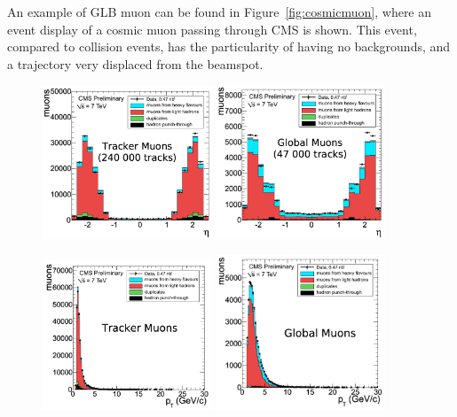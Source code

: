 An example of GLB muon can be found in Figure~\ref{fig:cosmicmuon},
where an event display of a cosmic muon passing through CMS is
shown. This event, compared to collision events, has the particularity
of having no backgrounds, and a trajectory very displaced from the
beamspot.
\begin{figure}[!htb]
  \begin{center}
    \includegraphics[width=0.45\textwidth]{Chapters/xLHCMS/TrkMuon_eta.png}
    \includegraphics[width=0.45\textwidth]{Chapters/xLHCMS/GlbMuon_eta.png}


    \includegraphics[width=0.45\textwidth]{Chapters/xLHCMS/TrkMuon_pt.png}
    \includegraphics[width=0.45\textwidth]{Chapters/xLHCMS/GlbMuon_pt.png}


\end{center}
\end{figure}
